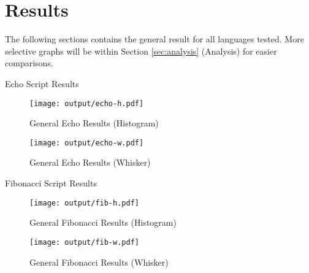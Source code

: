 \section{Results} \label{sec:results}
The following sections contains the general result for all languages tested. More selective graphs will be within Section \ref{sec:analysis} (Analysis) for easier comparisons.

\begin{table}[H]
	\centering
	\caption{Echo Script Results}
	\label{tab:echo}
\end{table}

\begin{figure}[H]
	\centering
		\texttt{[image: output/echo-h.pdf]}
	\caption{General Echo Results (Histogram)}
	\label{fig:echo-h}
\end{figure}

\begin{figure}[H]
	\centering
		\texttt{[image: output/echo-w.pdf]}
	\caption{General Echo Results (Whisker)}
	\label{fig:echo-w}
\end{figure}

\begin{table}[H]
	\centering
	\caption{Fibonacci Script Results}
	\label{tab:fib}
\end{table}

\begin{figure}[H]
	\centering
		\texttt{[image: output/fib-h.pdf]}
	\caption{General Fibonacci Results (Histogram)}
	\label{fig:fib-h}
\end{figure}

\begin{figure}[H]
	\centering
		\texttt{[image: output/fib-w.pdf]}
	\caption{General Fibonacci Results (Whisker)}
	\label{fig:fib-w}
\end{figure}

